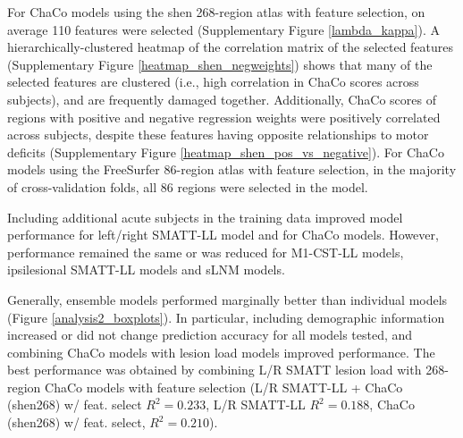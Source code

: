 \documentclass[10pt]{article}
\begin{document}
For ChaCo models using the shen 268-region atlas with feature selection, on average 110 features were selected (Supplementary Figure \ref{lambda_kappa}). A hierarchically-clustered heatmap of the correlation matrix of the selected features (Supplementary Figure \ref{heatmap_shen_negweights}) shows that many of the selected features are clustered (i.e., high correlation in ChaCo scores across subjects), and are frequently damaged together. Additionally, ChaCo scores of regions with positive and negative regression weights were positively correlated across subjects, despite these features having opposite relationships to motor deficits (Supplementary Figure \ref{heatmap_shen_pos_vs_negative}). For ChaCo models using the FreeSurfer 86-region atlas with feature selection, in the majority of cross-validation folds, all 86 regions were selected in the model. 

Including additional acute subjects in the training data improved model performance for left/right SMATT-LL model and for ChaCo models. However, performance remained the same or was reduced for M1-CST-LL models, ipsilesional SMATT-LL models and sLNM models.

Generally, ensemble models performed marginally better than individual models (Figure \ref{analysis2_boxplots}). In particular, including demographic information increased or did not change prediction accuracy for all models tested, and combining ChaCo models with lesion load models improved performance.  The best performance was obtained by combining L/R SMATT lesion load with 268-region ChaCo models with feature selection (L/R SMATT-LL + ChaCo (shen268) w/ feat. select $R^2 = 0.233$, L/R SMATT-LL $R^2=0.188$, ChaCo (shen268) w/ feat. select, $R^2=0.210$).\\
\end{document}
